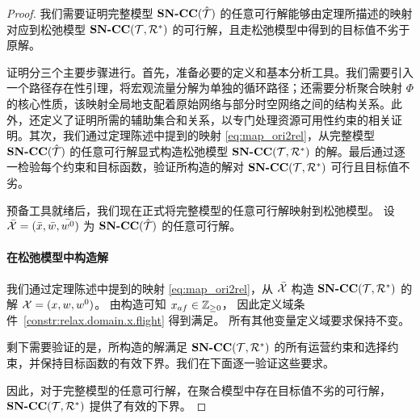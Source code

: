 \begin{proof}
我们需要证明完整模型 $\textbf{SN-CC}({\hat{\mathcal{T}}})$ 的任意可行解能够由定理所描述的映射对应到松弛模型 $\textbf{SN-CC}({\mathcal{T}, \mathcal{R}^{*}})$ 的可行解，且走松弛模型中得到的目标值不劣于原解。

证明分三个主要步骤进行。首先，准备必要的定义和基本分析工具。我们需要引入一个路径存在性引理，将宏观流量分解为单独的循环路径；还需要分析聚合映射 $\Phi$ 的核心性质，该映射全局地支配着原始网络与部分时空网络之间的结构关系。此外，还定义了证明所需的辅助集合和关系，以专门处理资源可用性约束的相关证明。其次，我们通过定理陈述中提到的映射 \eqref{eq:map_ori2rel}，从完整模型 $\textbf{SN-CC}({\hat{\mathcal{T}}})$ 的任意可行解显式构造松弛模型 $\textbf{SN-CC}({\mathcal{T}, \mathcal{R}^{*}})$ 的解。最后通过逐一检验每个约束和目标函数，验证所构造的解对 $\textbf{SN-CC}({\mathcal{T}, \mathcal{R}^{*}})$ 可行且目标值不劣。



预备工具就绪后，我们现在正式将完整模型的任意可行解映射到松弛模型。
设 $\bar{\mathcal{X}}=(\bar{x}, \bar{w}, \bar{{w^0}})$ 为 $\textbf{SN-CC}({\hat{\mathcal{T}}})$ 的任意可行解。

\paragraph*{在松弛模型中构造解}
我们通过定理陈述中提到的映射 \eqref{eq:map_ori2rel}，从 $\bar{\mathcal{X}}$ 构造 $\textbf{SN-CC}({\mathcal{T}, \mathcal{R}^{*}})$ 的解 $\mathcal{X} = (x, w, {w^0})$。
由构造可知 $x_{af}\in\mathbb{Z}_{\ge0}$，
因此定义域条件~\eqref{constr:relax.domain.x.flight} 得到满足。
所有其他变量定义域要求保持不变。

剩下需要验证的是，所构造的解满足 $\textbf{SN-CC}({\mathcal{T}, \mathcal{R}^{*}})$ 的所有运营约束和选择约束，并保持目标函数的有效下界。我们在下面逐一验证这些要求。










因此，对于完整模型的任意可行解，在聚合模型中存在目标值不劣的可行解，$\textbf{SN-CC}({\mathcal{T}, \mathcal{R}^{*}})$ 提供了有效的下界。
\end{proof}
